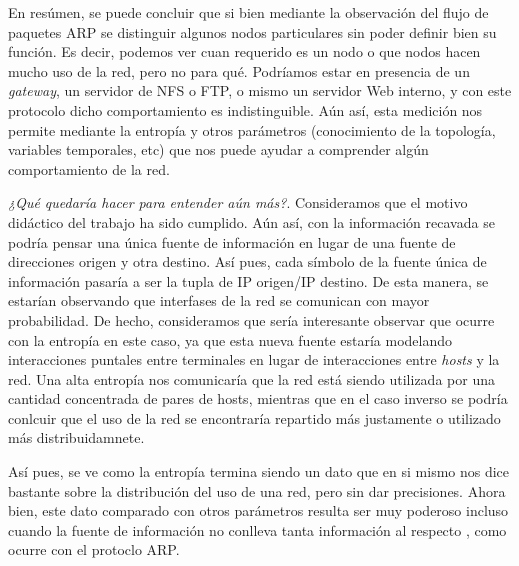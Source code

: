 \par En res\'umen, se puede concluir que si bien mediante la observaci\'on del flujo de paquetes ARP
se distinguir algunos nodos particulares sin poder definir bien su funci\'on. Es decir,
podemos ver cuan requerido es un nodo o que nodos hacen mucho uso de la red, pero no para qu\'e.
Podr\'iamos estar en presencia de un \textit{gateway}, un servidor de NFS o FTP, o mismo
un servidor Web interno, y con este protocolo dicho comportamiento es indistinguible. A\'un as\'i,
esta medici\'on nos permite mediante la entrop\'ia y otros par\'ametros (conocimiento de la 
topolog\'ia, variables temporales, etc) que nos puede ayudar a comprender alg\'un comportamiento
de la red.

\par \emph{¿Qu\'e quedar\'ia hacer para entender a\'un m\'as?}. Consideramos que el motivo
did\'actico del trabajo ha sido cumplido. A\'un as\'i, con la informaci\'on recavada se podr\'ia
pensar una \'unica fuente de informaci\'on en lugar de una fuente de direcciones origen y
otra destino. As\'i pues, cada s\'imbolo de la fuente \'unica de informaci\'on pasar\'ia
a ser la tupla de IP origen/IP destino. De esta manera, se estar\'ian observando que
interfases de la red se comunican con mayor probabilidad. De hecho, consideramos que
ser\'ia interesante observar que ocurre con la entrop\'ia en este caso, ya que esta nueva
fuente estar\'ia modelando interacciones puntales entre terminales en lugar de interacciones
entre \textit{hosts} y la red. Una alta entrop\'ia nos comunicar\'ia que la red est\'a
siendo utilizada por una cantidad concentrada de pares de hosts, mientras que en el caso
inverso se podr\'ia conlcuir que el uso de la red se encontrar\'ia repartido m\'as justamente
o utilizado m\'as distribuidamnete.

\par As\'i pues, se ve como la entrop\'ia termina siendo un dato que en si mismo nos
dice bastante sobre la distribuci\'on del uso de una red, pero sin dar precisiones. Ahora bien,
este dato comparado con otros par\'ametros resulta ser muy poderoso incluso cuando
la fuente de informaci\'on no conlleva tanta informaci\'on al respecto , como ocurre con el
protoclo ARP.
